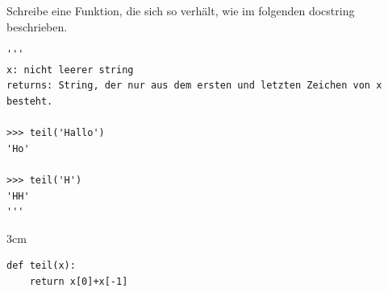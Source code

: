 
\question[2]
Schreibe eine Funktion, die sich so verhält, wie im folgenden docstring beschrieben.

 
\begin{lstlisting}
'''
x: nicht leerer string
returns: String, der nur aus dem ersten und letzten Zeichen von x besteht.
    
>>> teil('Hallo')
'Ho'

>>> teil('H')
'HH'
'''
\end{lstlisting}
 

\begin{solutionbox}{3cm}
\begin{lstlisting}
def teil(x):
    return x[0]+x[-1]
\end{lstlisting}
\end{solutionbox}
